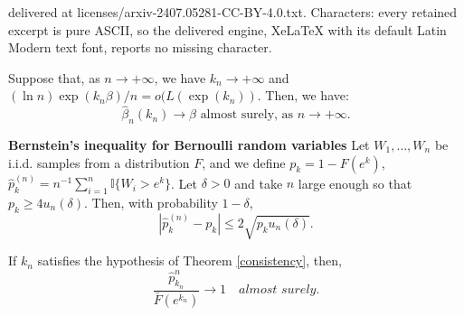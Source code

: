 \documentclass[10pt,a4paper]{amsart}
\newcommand{\I}{\mathbb{I}}
\begin{document}
delivered at licenses/arxiv-2407.05281-CC-BY-4.0.txt. Characters: every retained excerpt is pure ASCII, so the delivered engine, XeLaTeX with its default Latin Modern text font, reports no missing character.
\begin{theorem}\label{consistency}
    Suppose that, as $n\rightarrow +\infty$, we have \(k_n\to +\infty\) and $(\ln n)\exp(k_n\beta)/n=o(L(\exp(k_n))$. Then, we have:
    \begin{equation*}
        \widehat{\beta}_n(k_n)\to\beta \text{ almost surely, as } n\rightarrow +\infty.
    \end{equation*}
\end{theorem}

    \begin{lemma}\label{bernstein}\textbf{Bernstein's inequality for Bernoulli random variables}
        Let \(W_1,\ldots,W_n\) be i.i.d. samples from a distribution \(F\), and we
        define \(p_k=1-F(e^k)\), \({\widehat p^{(n)}_k} =n^{-1}\sum_{i = 1}^n {\I\{ {{W_i} > {e^k}} \}}\).
        Let \(\delta>0\)
        and take \(n\) large enough so that \(p_k\geq 4u_n(\delta)\). Then, with
        probability \(1-\delta\),
        \begin{equation*}
            \left|\widehat{p}^{(n)}_k-p_k\right|\leq 2\sqrt{p_k u_n(\delta)}.
        \end{equation*}
    \end{lemma}

\begin{lemma}\label{convergence_probability_p_k}
    If \(k_n\) satisfies the hypothesis of Theorem \ref{consistency}, then,
    \[\frac{{\widehat p_{{k_n}}^n}}{{\bar F\left( {{e^{{k_n}}}} \right)}}\to 1\quad \textit{almost surely}.\]
\end{lemma}
\end{document}
